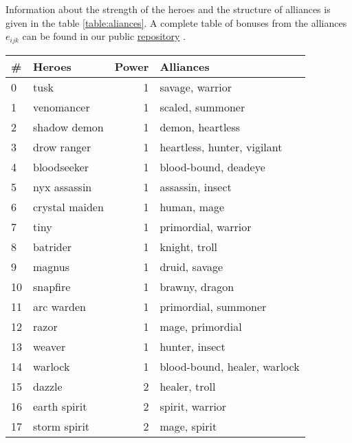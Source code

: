 \documentclass[smallextended]{svjour3}       %
\begin{document}
Information about the strength of the heroes and the structure of alliances is given in the table \ref{table:aliances}. 
A complete table  of bonuses from the alliances $e_{ijk} $ can be found in our public \href{https://github.com/aponom84/UnderLords/blob/master/UnderLordsData.xlsx}{repository} \cite{UnderLordsInput}.

\begin{table}
\center
\resizebox{!}{9cm} {
\begin{tabular}{llrl}
{\#} &                 Heroes &  Power &                       Alliances \\
\midrule
0  &                 tusk &      1 &               savage, warrior  \\
1  &           venomancer &      1 &               scaled, summoner \\
2  &         shadow demon &      1 &               demon, heartless \\
3  &          drow ranger &      1 &    heartless, hunter, vigilant \\
4  &          bloodseeker &      1 &           blood-bound, deadeye \\
5  &         nyx assassin &      1 &               assassin, insect \\
6  &       crystal maiden &      1 &                    human, mage \\
7  &                 tiny &      1 &           primordial, warrior  \\
8  &             batrider &      1 &                  knight, troll \\
9  &               magnus &      1 &                  druid, savage \\
10 &             snapfire &      1 &                 brawny, dragon \\
11 &           arc warden &      1 &           primordial, summoner \\
12 &                razor &      1 &               mage, primordial \\
13 &               weaver &      1 &                 hunter, insect \\
14 &              warlock &      1 &  blood-bound, healer, warlock  \\
15 &               dazzle &      2 &                  healer, troll \\
16 &         earth spirit &      2 &               spirit, warrior  \\
17 &         storm spirit &      2 &                   mage, spirit \\

\end{tabular}}
\end{table}
\end{document}
